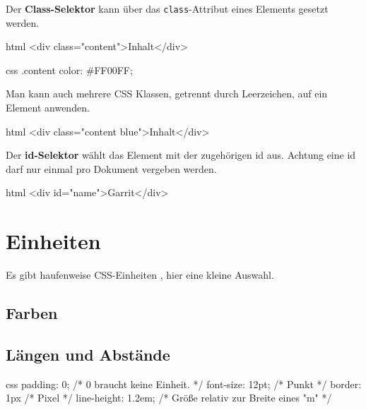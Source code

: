 \documentclass[10pt,a4paper]{article}
\begin{document}
\begin{multicols}{3}
Der \textbf{Class-Selektor} kann über das \texttt{class}-Attribut eines Elements gesetzt werden.
\begin{codebox}{html}{}
<div class="content">Inhalt</div>
\end{codebox}
\begin{codebox}{css}{}
.content {
  color: #FF00FF;
}
\end{codebox}
Man kann auch mehrere CSS Klassen, getrennt durch Leerzeichen, auf ein Element anwenden.
\begin{codebox}{html}{}
<div class="content blue">Inhalt</div>
\end{codebox}

Der \textbf{id-Selektor} wählt das Element mit der zugehörigen id aus. Achtung eine id darf nur einmal pro Dokument vergeben werden.
\begin{codebox}{html}{}
<div id="name">Garrit</div>
\end{codebox}


\section*{Einheiten}
Es gibt haufenweise CSS-Einheiten \cite{mdn-units}, hier eine kleine Auswahl.

\subsection*{Farben}

\subsection*{Längen und Abstände}
\begin{codebox}{css}{}
padding: 0;       /* 0 braucht keine Einheit. */
font-size: 12pt;  /* Punkt */
border: 1px       /* Pixel */
line-height: 1.2em; /* Größe relativ zur Breite eines "m" */
\end{codebox}


\end{multicols}
\end{document}
